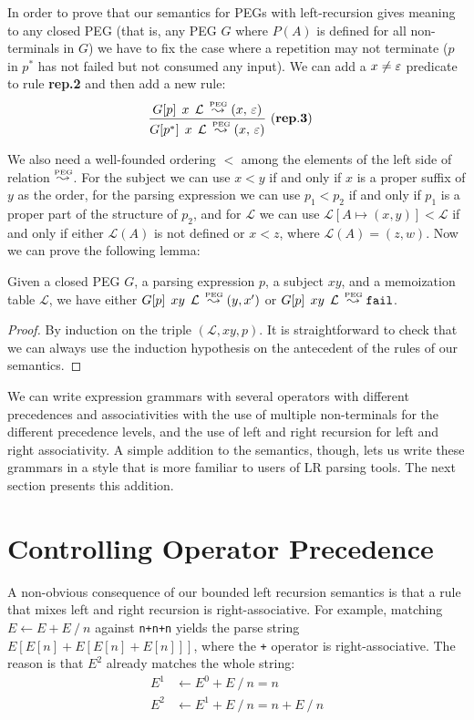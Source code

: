 In order to prove that our semantics for PEGs with left-recursion
gives meaning to any closed PEG (that is, any PEG $G$ where $P(A)$ is
defined for all non-terminals in $G$) we have to fix the case where a
repetition may not terminate ($p$ in $p^*$ has not failed but not
consumed any input). We can add a $x \neq \Epsi$ predicate to rule {\bf
  rep.2} and then add a new rule:
\begin{align*}
& {\frac{\Matgm{p}{x}{\mathcal{L}} \Lp \Tup{x}{\Epsi}}
	{\Matgm{p^*}{x}{\mathcal{L}} \Lp \Tup{x}{\Epsi}}} \mylabel{rep.3} 
\end{align*}

We also need a well-founded ordering $<$ among the elements of the left side
of relation $\Lp$. For the subject we can use $x < y$ if and only if
$x$ is a proper suffix of $y$ as the order, for the parsing expression
we can use $p_1 < p_2$ if and only if $p_1$ is a proper part of the
structure of $p_2$, and for $\mathcal{L}$ we can use $\mathcal{L}[A
\mapsto (x,y)] < \mathcal{L}$ if and only if either $\mathcal{L}(A)$ is not
defined or $x < z$, where $\mathcal{L}(A) = (z, w)$. Now we can prove
the following lemma:
\begin{lemma}[Completeness]
Given a closed PEG $G$, a parsing expression $p$, a subject $xy$, and a
memoization table $\mathcal{L}$, we have either
$\Matgm{p}{xy}{\mathcal{L}} \Lp (y,x^\prime)$ or
$\Matgm{p}{xy}{\mathcal{L}} \Lp \Nothing$.
\end{lemma}
\begin{proof}
By induction on the triple $(\mathcal{L},xy,p)$. It is straightforward
to check that we can always use the induction hypothesis on the
antecedent of the rules of our semantics.
\end{proof}

We can write expression grammars with several operators with different precedences
and associativities with the use of multiple non-terminals for the
different precedence levels, and the use of left and right recursion
for left and right associativity. A simple addition to the semantics,
though, lets us write these grammars in a style that is more familiar
to users of LR parsing tools. The next section presents this addition.

\section{Controlling Operator Precedence}
\label{sec:prec}

A non-obvious consequence of our bounded left recursion semantics is
that a rule that mixes left and right recursion is
right-associative. For example, matching $E \leftarrow E+E \ /\ n$
against {\tt n+n+n} yields the parse string $E[E[n]+E[E[n]+E[n]]]$,
where the {\tt +} operator is right-associative. The
reason is that $E^2$ already matches the whole string:
\begin{align*}
E^1 & \leftarrow E^0 + E \ / \ n = n \\
E^2 & \leftarrow E^1 + E \ / \ n = n + E \ / \ n
\end{align*}

